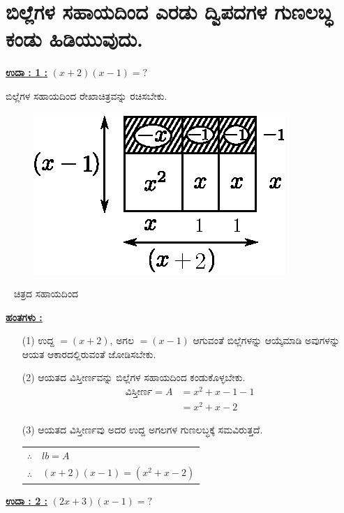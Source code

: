 \section{ಬಿಲ್ಲೆಗಳ ಸಹಾಯದಿಂದ ಎರಡು ದ್ವಿಪದಗಳ ಗುಣಲಬ್ಧ ಕಂಡು ಹಿಡಿಯು\break ವುದು.}\label{sec3.6}%

\noindent
{\textbf{\underline{ಉದಾ : 1 :}}} $(x + 2)(x - 1) = ?$

ಬಿಲ್ಲೆಗಳ ಸಹಾಯದಿಂದ ರೇಖಾಚಿತ್ರವನ್ನು ರಚಿಸಬೇಕು.
\begin{figure}[H]
\centering
\includegraphics[scale=0.8]{src/figure/chap3/fig3-31a.eps}
\end{figure}
~
\vskip -0.5cm
ಚಿತ್ರದ ಸಹಾಯದಿಂದ

\vfill\eject

\noindent
{\textbf{\underline{ಹಂತಗಳು :}}}
\begin{itemize}
\item [(1)] ಉದ್ದ $= (x+2)$, ಅಗಲ $= (x - 1)$ ಆಗುವಂತೆ ಬಿಲ್ಲೆಗಳನ್ನು ಆಯ್ಕೆಮಾಡಿ ಅವುಗಳನ್ನು ಆಯತ ಆಕಾರದಲ್ಲಿರುವಂತೆ ಜೋಡಿಸಬೇಕು.
\item [(2)] ಆಯತದ ವಿಸ್ತೀರ್ಣವನ್ನು ಬಿಲ್ಲೆಗಳ ಸಹಾಯದಿಂದ ಕಂಡುಕೊಳ್ಳಬೇಕು.
\begin{align*}
\text{ವಿಸ್ತೀರ್ಣ} = A & = x^2 + x - 1 - 1\\
& = x^2 + x - 2
\end{align*}

\item [(3)] ಆಯತದ ವಿಸ್ತೀರ್ಣವು ಅದರ ಉದ್ದ ಅಗಲಗಳ ಗುಣಲಬ್ಧಕ್ಕೆ ಸಮವಿರುತ್ತದೆ. 
\begin{tabular}{ll}
$\therefore$ & $lb = A$\\
$\therefore$ & $(x+2)(x-1) = (x^2 + x - 2)$
\end{tabular}

\end{itemize}

\medskip
\noindent
{\textbf{\underline{ಉದಾ : 2 :}}} $(2x + 3) (x - 1) = ?$

